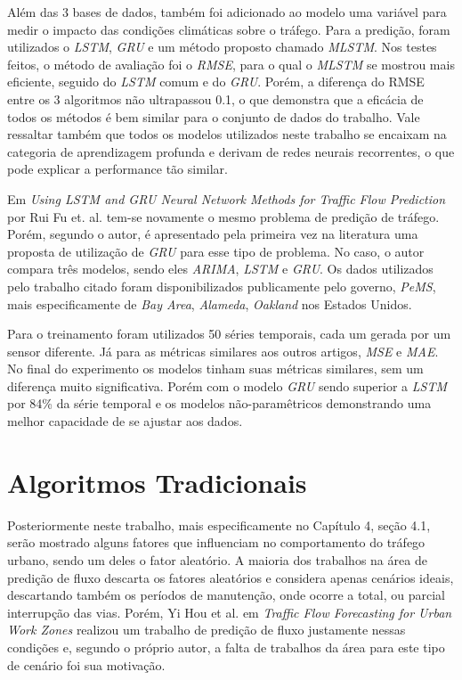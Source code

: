 Além das 3 bases de dados, também foi adicionado ao modelo uma variável para medir o impacto das condições climáticas sobre o tráfego.
Para a predição, foram utilizados o \textit{\acrshort{LSTM}}, \textit{\acrshort{GRU}} e um método proposto chamado \textit{\acrfull{MLSTM}}. Nos testes feitos, o método de avaliação foi o \textit{\acrshort{RMSE}}, para o qual o \textit{\acrshort{MLSTM}} se mostrou mais eficiente, seguido do \textit{\acrshort{LSTM}} comum e do \textit{\acrshort{GRU}}. Porém, a diferença do RMSE entre os 3 algoritmos não ultrapassou 0.1, o que demonstra que a eficácia de todos os métodos é bem similar para o conjunto de dados do trabalho. Vale ressaltar também que todos os modelos utilizados neste trabalho se encaixam na categoria de aprendizagem profunda e derivam de redes neurais recorrentes, o que pode explicar a performance tão similar.

Em \textit{Using LSTM and GRU Neural Network Methods for Traffic Flow Prediction} \cite{fu2016using} por Rui Fu et. al. tem-se novamente o mesmo problema de predição de tráfego. Porém, segundo o autor, é apresentado pela primeira vez na literatura uma proposta de utilização de \textit{\acrfull{GRU}} para esse tipo de problema. No caso, o autor compara três modelos, sendo eles \textit{\acrshort{ARIMA}}, \textit{\acrshort{LSTM}} e \textit{\acrshort{GRU}}. Os dados utilizados pelo trabalho citado foram disponibilizados publicamente pelo governo, \textit{PeMS}, mais especificamente de \textit{Bay Area}, \textit{Alameda}, \textit{Oakland} nos Estados Unidos. 

Para o treinamento foram utilizados 50 séries temporais, cada um gerada por um sensor diferente. Já para as métricas similares aos outros artigos, \textit{\acrshort{MSE}} e \textit{\acrshort{MAE}}. No final do experimento os modelos tinham suas métricas similares, sem um diferença muito significativa. Porém com o modelo \textit{\acrshort{GRU}} sendo superior a \textit{\acrshort{LSTM}} por 84\% da série temporal e os modelos não-paramêtricos demonstrando uma melhor capacidade de se ajustar aos dados.

\section{Algoritmos Tradicionais}

Posteriormente neste trabalho, mais especificamente no Capítulo 4, seção 4.1, serão mostrado alguns fatores que influenciam no comportamento do tráfego urbano, sendo um deles o fator aleatório. A maioria dos trabalhos na área de predição de fluxo descarta os fatores aleatórios e considera apenas cenários ideais, descartando também os períodos de manutenção, onde ocorre a total, ou parcial interrupção das vias. Porém, Yi Hou et al. em \textit{Traffic Flow Forecasting for Urban Work Zones} \cite{hou2014traffic} realizou um trabalho de predição de fluxo justamente nessas condições e, segundo o próprio autor, a falta de trabalhos da área para este tipo de cenário foi sua motivação. 

